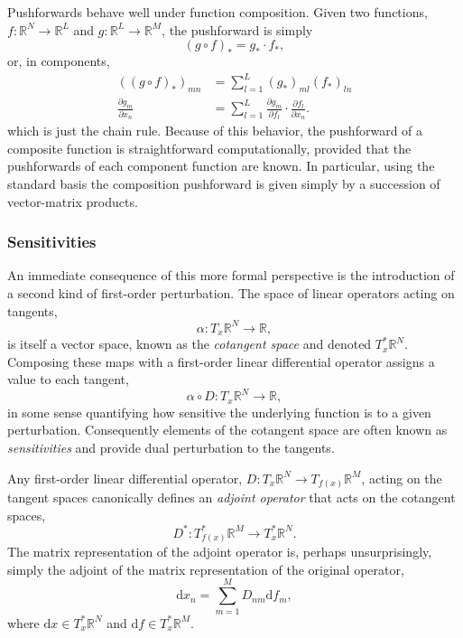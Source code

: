 Pushforwards behave well under function composition.  Given two functions,
$f : \mathbb{R}^{N} \rightarrow \mathbb{R}^{L}$ and
$g : \mathbb{R}^{L} \rightarrow \mathbb{R}^{M}$, the pushforward is simply
%
\begin{equation*}
\left( g \circ f \right)_{*} = g_{*} \cdot f_{*},
\end{equation*}
%
or, in components,
%
\begin{align*}
\left( \left( g \circ f \right)_{*} \right)_{mn} &= 
\sum_{l = 1}^{L} \left( g_{*} \right)_{ml} \left( f_{*} \right)_{ln}
\\
\frac{ \partial g_{m} }{ \partial x_{n} } &= 
\sum_{l = 1}^{L} \frac{ \partial g_{m} }{ \partial f_{l} } \cdot \frac{ \partial f_{l} }{ \partial x_{n} }.
\end{align*}
%
which is just the chain rule.  Because of this behavior, the pushforward of a
composite function is straightforward computationally, provided that the pushforwards
of each component function are known.  In particular, using the standard basis the
composition pushforward is given simply by a succession of vector-matrix products.

\subsubsection{Sensitivities}

An immediate consequence of this more formal perspective is the introduction of a second
kind of first-order perturbation.  The space of linear operators acting on tangents,
%
\begin{equation*}
\alpha : T_{x} \mathbb{R}^{N} \rightarrow \mathbb{R},
\end{equation*}
%
is itself a vector space, known as the \textit{cotangent space} and denoted 
$T^{*}_{x} \mathbb{R}^{N}$.  Composing these maps with a first-order linear differential 
operator assigns a value to each tangent,
%
\begin{equation*}
\alpha \circ D : T_{x} \mathbb{R}^{N} \rightarrow \mathbb{R},
\end{equation*}
%
in some sense quantifying how sensitive the underlying function is to a given 
perturbation.  Consequently elements of the cotangent space are often known as
\textit{sensitivities} and provide dual perturbation to the tangents.

Any first-order linear differential operator,
$D : T_{x} \mathbb{R}^{N} \rightarrow T_{ f ( x ) } \mathbb{R}^{M}$, acting on
the tangent spaces canonically defines an \textit{adjoint operator} that acts on the 
cotangent spaces,
%
\begin{equation*}
D^{*} : T^{*}_{f (x) } \mathbb{R}^{M} \rightarrow T^{*}_{x} \mathbb{R}^{N}.
\end{equation*}
%
The matrix representation of the adjoint operator is, perhaps unsurprisingly, 
simply the adjoint of the matrix representation of the original operator,
%
\begin{equation*}
\mathrm{d} x_{n} = \sum_{m = 1}^{M} D_{nm} \mathrm{d} f_{m},
\end{equation*}
%
where $\mathrm{d} x \in T^{*}_{x} \mathbb{R}^{N}$ and
$\mathrm{d} f \in T^{*}_{x} \mathbb{R}^{M}$.

